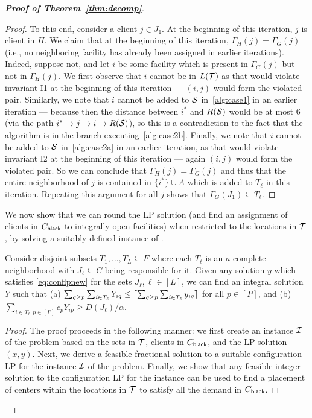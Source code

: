 \begin{proof}[{\bf Proof of Theorem~\ref{thm:decomp}}]
\begin{proof}
To this end, consider a client $j \in J_1$. At the beginning of this iteration, $j$ is client  in $H$. 
We claim that at the beginning of this iteration, $\Gamma_H(j) = \Gamma_G(j)$ (i.e., no neighboring facility has already been assigned in earlier iterations). Indeed, suppose not, and let $i$ be some facility which is present in $\Gamma_G(j)$ but not in $\Gamma_H(j)$. We first observe that $i$ cannot be in $L({\cal T})$ as that would violate invariant I1 at the beginning of this iteration --- $(i,j)$ would form the violated pair. Similarly, we note that $i$ cannot be added to ${\cal S}$ in~\cref{alg:case1} in an earlier iteration --- because then the distance between $i^*$ and $R({\cal S})$ would be at most $6$ (via the path $i^* \rightarrow j \rightarrow i \rightarrow R({\cal S})$), so this is a contradiction to the fact that the algorithm is in the branch executing~\cref{alg:case2b}. Finally, we note that $i$ cannot be added to ${\cal S}$ in~\cref{alg:case2a} in an earlier iteration, as that would violate invariant I2 at the beginning of this iteration --- again $(i,j)$ would form the violated pair.
So we can conclude that $\Gamma_H(j) = \Gamma_G(j)$ and thus that the entire neighborhood of $j$ is contained in $\{i^*\} \cup A$ which is added to $T_\ell$ in this iteration. Repeating this argument for all $j$ shows that $\Gamma_G(J_1) \subseteq T_\ell$.
\end{proof}

We now show that we can round the LP solution (and find an assignment of clients in $C_{\mathsf{black}}$ to integrally open facilities) when restricted to the locations in  ${\cal T}$, by solving a suitably-defined instance of \cckp.
\begin{lemma}\label{lem:rounding-local-neighborhoods}
	Consider disjoint subsets $T_1,\ldots,T_L \subseteq F$ where each $T_\ell$ is an $a$-complete neighborhood with $J_\ell\subseteq C$ being responsible for it.
	Given any solution $y$ which satisfies \eqref{eq:conflpnew} for the sets $J_\ell, \ell \in [L]$, we can find an integral solution $Y$ such that
	 (a) $\sum_{q\geq p} \sum_{i\in T_\ell} Y_{iq} \leq \lceil\sum_{q\geq p} \sum_{i\in T_\ell} y_{iq}\rceil$ for all $p\in [P]$, and
	 (b) $\sum_{i\in T_\ell,p\in [P]} c_p Y_{ip} \geq D(J_\ell)/\alpha$.
\end{lemma}
\begin{proof}
The proof proceeds in the following manner: we first create an instance ${\cal I}$ of the \cckp problem based on the sets in ${\cal T}$, clients in $C_{\mathsf{black}}$, and the LP solution $(x,y)$. Next, we derive a feasible fractional solution to a suitable configuration LP for the instance ${\cal I}$ of the \cckp problem. Finally, we show that any feasible integer solution to the configuration LP for the \cckp instance can be used to find a placement of centers within the
locations in ${\cal T}$ to satisfy all the demand in $C_{\mathsf{black}}$.


\end{proof}
\end{proof}
